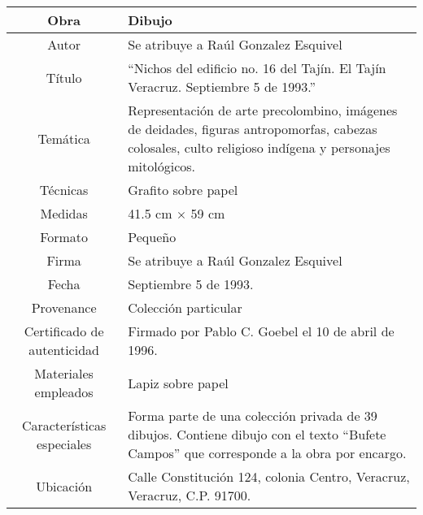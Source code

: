 \begin{table}[H]
\centering
\begin{tabular}{|c|m{}|}
\hline
Obra& Dibujo	\\
\hline
Autor & Se atribuye a Ra\'ul Gonzalez Esquivel\\
\hline
T\'itulo & ``Nichos del edificio no. 16 del Taj\'in. El Taj\'in Veracruz. Septiembre 5 de 1993.''\\
\hline
Tem\'atica & Representaci\'on de arte precolombino, im\'agenes de deidades, figuras antropomorfas, cabezas colosales, culto religioso ind\'igena y personajes mitol\'ogicos.\\
\hline
T\'ecnicas &Grafito sobre papel \\
\hline
Medidas & 41.5 cm $\times$ 59 cm \\
\hline
 Formato & Peque\~no \\
 \hline
 Firma & Se atribuye a Ra\'ul Gonzalez Esquivel  \\
 \hline
  Fecha & Septiembre 5 de 1993.\\
 \hline
 Provenance & Colecci\'on particular\\
 \hline
 Certificado de autenticidad& Firmado por Pablo C. Goebel el 10 de abril de 1996.  \\
 \hline 
  Materiales empleados & Lapiz sobre papel\\
 \hline
 Caracter\'isticas especiales & Forma parte de una colecci\'on privada de 39 dibujos. 
Contiene dibujo con el texto ``Bufete Campos'' que corresponde a la obra por encargo. \\
\hline 
Ubicaci\'on & Calle Constituci\'on 124, colonia Centro, Veracruz, Veracruz, C.P. 91700.\\
\hline

\end{tabular}
\end{table}

